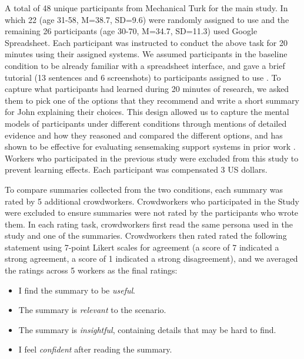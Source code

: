 A total of 48 unique participants from Mechanical Turk for the main study. In which 22 (age 31-58, M=38.7, SD=9.6) were randomly assigned to use \SYSTEM and the remaining 26 participants (age 30-70, M=34.7, SD=11.3) used Google Spreadsheet. Each participant was instructed to conduct the above task for 20 minutes using their assigned systems. We assumed participants in the baseline condition to be already familiar with a spreadsheet interface, and gave a brief tutorial (13 sentences and 6 screenshots) to participants assigned to use \SYSTEM. To capture what participants had learned during 20 minutes of research, we asked them to pick one of the options that they recommend and write a short summary for John explaining their choices. This design allowed us to capture the mental models of participants under different conditions through mentions of detailed evidence and how they reasoned and compared the different options, and has shown to be effective for evaluating sensemaking support systems in prior work \cite{kammerer2009signpost,nelson2009little}. Workers who participated in the previous study were excluded from this study to prevent learning effects. Each participant was compensated 3 US dollars. 

To compare summaries collected from the two conditions, each summary was rated by 5 additional crowdworkers. Crowdworkers who participated in the Study were excluded to ensure summaries were not rated by the participants who wrote them. In each rating task, crowdworkers first read the same persona used in the study and one of the summaries. Crowdworkers then rated rated the following statement using 7-point Likert scales for agreement (a score of 7 indicated a strong agreement, a score of 1 indicated a strong disagreement), and we averaged the ratings across 5 workers as the final ratings:

\begin{itemize}
  \setlength\itemsep{0em}

    \item I find the summary to be \emph{useful}.
    \item The summary is \emph{relevant} to the scenario.
    \item The summary is \emph{insightful}, containing details that may be hard to find.
    \item I feel \emph{confident} after reading the summary.
\end{itemize}

